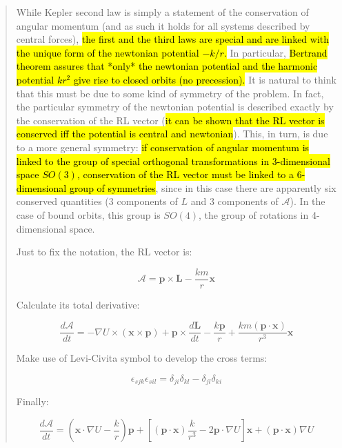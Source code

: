 \documentclass{article}
\numberwithin{equation}{subsection} %
\theoremstyle{definition}
\begin{document}
    \begin{quote}
        While Kepler second law is simply a statement of the conservation of angular momentum (and as such it holds for all systems described by central forces), \hl{the first and the third laws are special and are linked with the unique form of the newtonian potential $-k/r$.} In particular, \hl{Bertrand theorem assures that *only* the newtonian potential and the harmonic potential $kr^2$ give rise to closed orbits (no precession).} It is natural to think that this must be due to some kind of symmetry of the problem. In fact, the particular symmetry of the newtonian potential is described exactly by the conservation of the RL vector (\hl{it can be shown that the RL vector is conserved iff the potential is central and newtonian}). This, in turn, is due to a more general symmetry: \hl{if conservation of angular momentum is linked to the group of special orthogonal transformations in 3-dimensional space $SO(3)$, conservation of the RL vector must be linked to a 6-dimensional group of symmetries}, since in this case there are apparently six conserved quantities (3 components of $L$ and 3 components of $\mathcal A$). In the case of bound orbits, this group is $SO(4)$, the group of rotations in 4-dimensional space.  

        Just to fix the notation, the RL vector is:

        \begin{equation} \mathcal{A}=\textbf{p}\times\textbf{L}-\frac{km}{r}\textbf{x} \end{equation}

        Calculate its total derivative:

        \begin{equation}\frac{d\mathcal{A}}{dt}=-\nabla U\times(\textbf{x}\times\textbf{p})+\textbf{p}\times\frac{d\textbf{L}}{dt}-\frac{k\textbf{p}}{r}+\frac{km(\textbf{p}\cdot \textbf{x})}{r^3}\textbf{x} \end{equation}

        Make use of Levi-Civita symbol to develop the cross terms:

        \begin{equation}\epsilon_{sjk}\epsilon_{sil}=\delta_{ji}\delta_{kl}-\delta_{jl}\delta_{ki}   \end{equation}

        Finally:

        \begin{equation}
        \frac{d\mathcal{A}}{dt}=\left(\textbf{x}\cdot\nabla U-\frac{k}{r}\right)\textbf{p}+\left[(\textbf{p}\cdot\textbf{x})\frac{k}{r^3}-2\textbf{p}\cdot\nabla U\right]\textbf{x}+(\textbf{p}\cdot\textbf{x})\nabla U
        \end{equation}


\end{quote}
\end{document}

